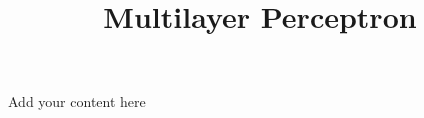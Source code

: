 \title{Multilayer Perceptron}
\label{chp:multilayer-perceptron}
\author{}
\institute{}
\maketitle



Add your content here




